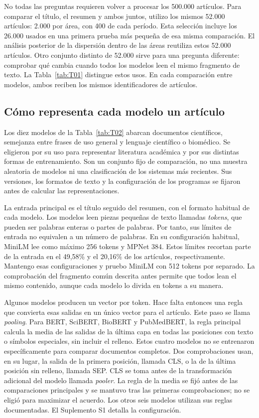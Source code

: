 \documentclass[12pt]{article}
\begin{document}
No todas las preguntas requieren volver a procesar los 500.000 artículos. Para comparar el título, el resumen y ambos juntos, utilizo los mismos 52.000 artículos: 2.000 por área, con 400 de cada período. Esta selección incluye los 26.000 usados en una primera prueba más pequeña de esa misma comparación. El análisis posterior de la dispersión dentro de las áreas reutiliza estos 52.000 artículos. Otro conjunto distinto de 52.000 sirve para una pregunta diferente: comprobar qué cambia cuando todos los modelos leen el mismo fragmento de texto. La Tabla~\ref{tab:T01} distingue estos usos. En cada comparación entre modelos, ambos reciben los mismos identificadores de artículos.


\subsection{Cómo representa cada modelo un artículo}
Los diez modelos de la Tabla~\ref{tab:T02} abarcan documentos científicos, semejanza entre frases de uso general y lenguaje científico o biomédico. Se eligieron por su uso para representar literatura académica y por sus distintas formas de entrenamiento. Son un conjunto fijo de comparación, no una muestra aleatoria de modelos ni una clasificación de los sistemas más recientes. Sus versiones, los formatos de texto y la configuración de los programas se fijaron antes de calcular las representaciones.

La entrada principal es el título seguido del resumen, con el formato habitual de cada modelo. Los modelos leen piezas pequeñas de texto llamadas \emph{tokens}, que pueden ser palabras enteras o partes de palabras. Por tanto, sus límites de entrada no equivalen a un número de palabras. En su configuración habitual, MiniLM lee como máximo 256 tokens y MPNet 384. Estos límites recortan parte de la entrada en el 49,58\% y el 20,16\% de los artículos, respectivamente. Mantengo esas configuraciones y pruebo MiniLM con 512 tokens por separado. La comprobación del fragmento común descrita antes permite que todos lean el mismo contenido, aunque cada modelo lo divida en tokens a su manera.

Algunos modelos producen un vector por token. Hace falta entonces una regla que convierta esas salidas en un único vector para el artículo. Este paso se llama \emph{pooling}. Para BERT, SciBERT, BioBERT y PubMedBERT, la regla principal calcula la media de las salidas de la última capa en todas las posiciones con texto o símbolos especiales, sin incluir el relleno. Estos cuatro modelos no se entrenaron específicamente para comparar documentos completos. Dos comprobaciones usan, en su lugar, la salida de la primera posición, llamada CLS, o la de la última posición sin relleno, llamada SEP. CLS se toma antes de la transformación adicional del modelo llamada \emph{pooler}. La regla de la media se fijó antes de las comparaciones principales y se mantuvo tras las primeras comprobaciones; no se eligió para maximizar el acuerdo. Los otros seis modelos utilizan sus reglas documentadas. El Suplemento S1 detalla la configuración.

\end{document}

